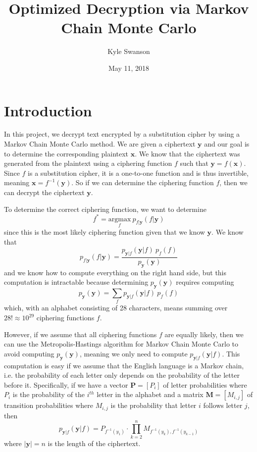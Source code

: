 \documentclass{article}
\title{Optimized Decryption via Markov Chain Monte Carlo}
\author{Kyle Swanson}
\date{May 11, 2018}
\begin{document}
\maketitle

\section{Introduction}\label{sec:intro}

In this project, we decrypt text encrypted by a substitution cipher by using a Markov Chain Monte Carlo method. We are given a ciphertext $\mathbf{y}$ and our goal is to determine the corresponding plaintext $\mathbf{x}$. We know that the ciphertext was generated from the plaintext using a ciphering function $f$ such that $\mathbf{y} = f(\mathbf{x})$. Since $f$ is a substitution cipher, it is a one-to-one function and is thus invertible, meaning $\mathbf{x} = f^{-1}(\mathbf{y})$. So if we can determine the ciphering function $f$, then we can decrypt the ciphertext $\mathbf{y}$.

To determine the correct ciphering function, we want to determine $$f^* = \underset{f}{\textrm{argmax}}\ p_{f|\mathbf{y}}(f|\mathbf{y})$$ since this is the most likely ciphering function given that we know $\mathbf{y}$. We know that $$p_{f|\mathbf{y}}(f|\mathbf{y}) = \frac{p_{\mathbf{y}|f}(\mathbf{y}|f)\ p_f(f)}{p_{\mathbf{y}}(\mathbf{y})}$$ and we know how to compute everything on the right hand side, but this computation is intractable because determining $p_{\mathbf{y}}(\mathbf{y})$ requires computing $$p_{\mathbf{y}}(\mathbf{y}) = \sum_f p_{\mathbf{y}|f}(\mathbf{y}|f)\ p_f(f)$$ which, with an alphabet consisting of 28 characters, means summing over $28! \approx 10^{29}$ ciphering functions $f$.

However, if we assume that all ciphering functions $f$ are equally likely, then we can use the Metropolis-Hastings algorithm for Markov Chain Monte Carlo to avoid computing $p_{\mathbf{y}}(\mathbf{y})$, meaning we only need to compute $p_{\mathbf{y}|f}(\mathbf{y}|f)$. This computation is easy if we assume that the English language is a Markov chain, i.e. the probability of each letter only depends on the probability of the letter before it. Specifically, if we have a vector $\mathbf{P} = [P_i]$ of letter probabilities where $P_i$ is the probability of the $i^{th}$ letter in the alphabet and a matrix $\mathbf{M} = [M_{i,j}]$ of transition probabilities where $M_{i,j}$ is the probability that letter $i$ follows letter $j$, then
\begin{equation}\label{eq:prob}
    p_{\mathbf{y}|f}(\mathbf{y}|f) = P_{f^{-1}(y_1)} \cdot \prod_{k=2}^n M_{f^{-1}(y_k), f^{-1}(y_{k-1})}
\end{equation}
where $|\mathbf{y}| = n$ is the length of the ciphertext.
\end{document}
